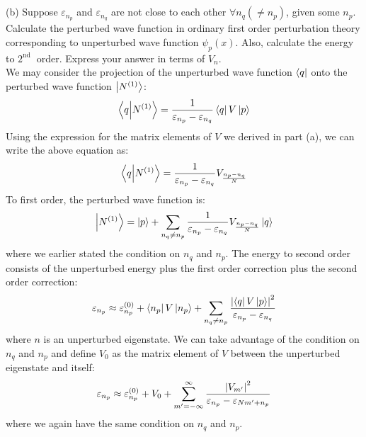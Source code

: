\documentclass[12pt]{article}
\begin{document}
\subsection{}
(b) Suppose $\varepsilon_{n_{p}}$ and $\varepsilon_{n_{q}}$ are not close to each other $\forall n_{q}\left(\neq n_{p}\right)$, given some $n_{p}$. Calculate the perturbed wave function in ordinary first order perturbation theory corresponding to unperturbed wave function $\psi_{p}(x)$. Also, calculate the energy to $2^{\text {nd }}$ order. Express your answer in terms of $V_{n}$.\\
We may consider the projection of the unperturbed wave function $\bra{q}$ onto the perturbed wave function $\ket{N^{(1)}}$:
\begin{equation}
  \bra{q}\ket{N^{(1)}}=\frac{1}{\varepsilon _{n_{p}}-\varepsilon _{n_{q}}}\bra{q}V\ket{p}
\end{equation}
Using the expression for the matrix elements of $V$ we derived in part (a), we can write the above equation as:
\begin{equation}
  \bra{q}\ket{N^{(1)}}=\frac{1}{\varepsilon _{n_{p}}-\varepsilon _{n_{q}}}V_{\frac{n_{p}-n_{q}}{N}}
\end{equation}
To first order, the perturbed wave function is:
\begin{equation}
  \ket{N^{(1)}}=\ket{p}+\sum_{n_{q}\neq n_{p}}\frac{1}{\varepsilon _{n_{p}}-\varepsilon _{n_{q}}}V_{\frac{n_{p}-n_{q}}{N}}\ket{q}
\end{equation}
where we earlier stated the condition on $n_{q}$ and $n_{p}$.
The energy to second order consists of the unperturbed energy plus the first order correction plus the second order correction:
\begin{equation}
  \varepsilon _{n_{p}}\approx\varepsilon _{n_{p}}^{(0)}+\bra{n_p}V\ket{n_p}+\sum_{n_{q}\neq n_{p}}\frac{\abs{\bra{q}V\ket{p}}^{2}}{\varepsilon _{n_{p}}-\varepsilon _{n_{q}}}
\end{equation}
where $n$ is an unperturbed eigenstate. We can take advantage of the condition on $n_{q}$ and $n_{p}$ and define $V_0$ as the matrix element of $V$ between the unperturbed eigenstate and itself:  
\begin{equation}
  \varepsilon _{n_{p}}\approx\varepsilon _{n_{p}}^{(0)}+V_{0}+\sum_{m'= -\infty}^{\infty}\frac{\abs{V_{m'}}^{2}}{\varepsilon _{n_{p}}-\varepsilon _{Nm'+n_{p}}}
\end{equation}
where we again have the same condition on $n_{q}$ and $n_{p}$.
\end{document}
